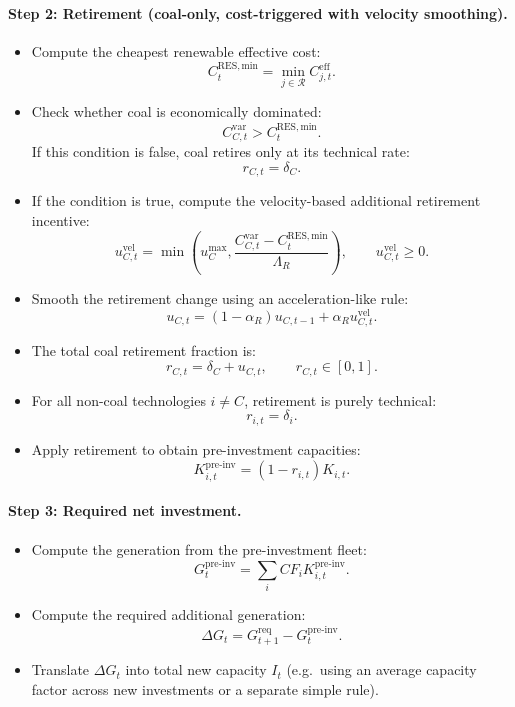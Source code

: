 \documentclass[preprint,authoryear,12pt]{elsarticle}
\begin{document}
\noindent
\paragraph{Step 2: Retirement (coal-only, cost-triggered with velocity smoothing).}
\begin{itemize}

    \item Compute the cheapest renewable effective cost:
    \[
        C_{t}^{\mathrm{RES,min}} = \min_{j \in \mathcal{R}} C_{j,t}^{\mathrm{eff}}.
    \]

    \item Check whether coal is economically dominated:
    \[
        C_{C,t}^{\mathrm{var}} > C_{t}^{\mathrm{RES,min}}.
    \]
    If this condition is false, coal retires only at its technical rate:  
    \[
        r_{C,t} = \delta_C.
    \]

    \item If the condition is true, compute the velocity-based additional retirement incentive:
    \[
        u_{C,t}^{\mathrm{vel}}
        =
        \min\!\left(
            u_C^{\max},
            \frac{C_{C,t}^{\mathrm{var}} - C_{t}^{\mathrm{RES,min}}}{\Lambda_R}
        \right), \qquad u_{C,t}^{\mathrm{vel}} \ge 0.
    \]

    \item Smooth the retirement change using an acceleration-like rule:
    \[
        u_{C,t}
        = (1 - \alpha_R) u_{C,t-1} + \alpha_R u_{C,t}^{\mathrm{vel}}.
    \]

    \item The total coal retirement fraction is:
    \[
        r_{C,t} = \delta_C + u_{C,t}, \qquad r_{C,t} \in [0,1].
    \]

    \item For all non-coal technologies $i \neq C$, retirement is purely technical:
    \[
        r_{i,t} = \delta_i.
    \]

    \item Apply retirement to obtain pre-investment capacities:
    \[
        K_{i,t}^{\mathrm{pre\text{-}inv}} = (1 - r_{i,t}) K_{i,t}.
    \]

\end{itemize}

\noindent
\paragraph{Step 3: Required net investment.}
\begin{itemize}
    \item Compute the generation from the pre-investment fleet:
    \[
        G_t^{\mathrm{pre\text{-}inv}} = \sum_i CF_i K_{i,t}^{\mathrm{pre\text{-}inv}}.
    \]
    \item Compute the required additional generation:
    \[
        \Delta G_t = G_{t+1}^{\mathrm{req}} - G_t^{\mathrm{pre\text{-}inv}}.
    \]
    \item Translate $\Delta G_t$ into total new capacity $I_t$ (e.g.\ using an average capacity
          factor across new investments or a separate simple rule).
\end{itemize}
\end{document}

